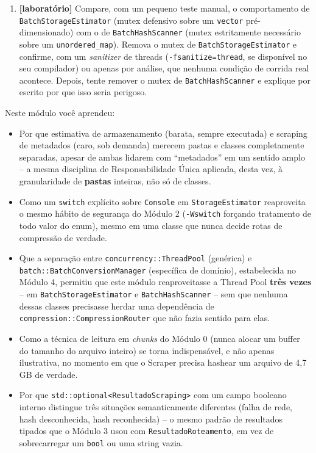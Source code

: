 \begin{CaixaDesafio}
\begin{enumerate}[label=\textbf{5.\arabic*}]
    \item \textbf{[laboratório]} Compare, com um pequeno teste manual, o comportamento de \texttt{BatchStorageEstimator} (mutex defensivo sobre um \texttt{vector} pré-dimensionado) com o de \texttt{BatchHashScanner} (mutex estritamente necessário sobre um \texttt{unordered\_map}). Remova o mutex de \texttt{BatchStorageEstimator} e confirme, com um \textit{sanitizer} de threads (\texttt{-fsanitize=thread}, se disponível no seu compilador) ou apenas por análise, que nenhuma condição de corrida real acontece. Depois, tente remover o mutex de \texttt{BatchHashScanner} e explique por escrito por que isso seria perigoso.
\end{enumerate}
\end{CaixaDesafio}

\begin{CaixaResumo}
Neste módulo você aprendeu:
\begin{itemize}
    \item Por que estimativa de armazenamento (barata, sempre executada) e scraping de metadados (caro, sob demanda) merecem pastas e classes completamente separadas, apesar de ambas lidarem com ``metadados'' em um sentido amplo -- a mesma disciplina de Responsabilidade Única aplicada, desta vez, à granularidade de \textbf{pastas} inteiras, não só de classes.
    \item Como um \texttt{switch} explícito sobre \texttt{Console} em \texttt{StorageEstimator} reaproveita o mesmo hábito de segurança do Módulo 2 (\texttt{-Wswitch} forçando tratamento de todo valor do enum), mesmo em uma classe que nunca decide rotas de compressão de verdade.
    \item Que a separação entre \texttt{concurrency::ThreadPool} (genérica) e \texttt{batch::BatchConversionManager} (específica de domínio), estabelecida no Módulo 4, permitiu que este módulo reaproveitasse a Thread Pool \textbf{três vezes} -- em \texttt{BatchStorageEstimator} e \texttt{BatchHashScanner} -- sem que nenhuma dessas classes precisasse herdar uma dependência de \texttt{compression::CompressionRouter} que não fazia sentido para elas.
    \item Como a técnica de leitura em \textit{chunks} do Módulo 0 (nunca alocar um buffer do tamanho do arquivo inteiro) se torna indispensável, e não apenas ilustrativa, no momento em que o Scraper precisa hashear um arquivo de 4,7 GB de verdade.
    \item Por que \texttt{std::optional<ResultadoScraping>} com um campo booleano interno distingue três situações semanticamente diferentes (falha de rede, hash desconhecida, hash reconhecida) -- o mesmo padrão de resultados tipados que o Módulo 3 usou com \texttt{ResultadoRoteamento}, em vez de sobrecarregar um \texttt{bool} ou uma string vazia.

\end{itemize}
\end{CaixaResumo}
